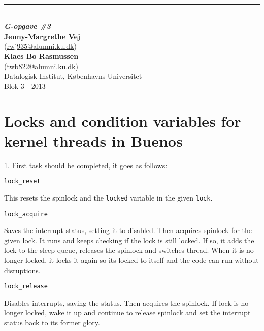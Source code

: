 \thispagestyle{empty}
\begin{flushright}
   {\Huge\textbf{\@title}}\\[3mm]
   \rule{\linewidth}{2mm}\\[3mm]
   {\Large\textbf{\textit{G-opgave \#3}}}\\
   \vspace{12cm}
   {\normalsize \textbf{Jenny-Margrethe Vej}
   \\(\url{rwj935@alumni.ku.dk})}
   \\
   {\normalsize \textbf{Klaes Bo Rasmussen}
   \\(\url{twb822@alumni.ku.dk})}
   \\
	\vspace*{2cm}
   {\normalsize Datalogisk Institut, Københavns Universitet}\\
   {\normalsize Blok 3 - 2013}\\
\end{flushright}
\clearpage


\section{Locks and condition variables for kernel threads in Buenos}
1. First task should be completed, it goes as follows:

\vspace{1pc}

\verb+lock_reset+ 

This resets the spinlock and the \verb+locked+ variable in the given
\verb+lock+.

\vspace{0.5pc}

\verb+lock_acquire+

Saves the interrupt status, setting it to disabled. Then acquires
spinlock for the given lock. It runs and keeps checking if the lock is
still locked. If so, it adds the lock to the sleep queue, releases the
spinlock and switches thread. When it is no longer locked, it locks it
again so its locked to itself and the code can run without
disruptions. 

\vspace{0.5pc}

\verb+lock_release+

Disables interrupts, saving the status. Then acquires the spinlock. If
lock is no longer locked, wake it up and continue to release spinlock
and set the interrupt status back to its former glory.

